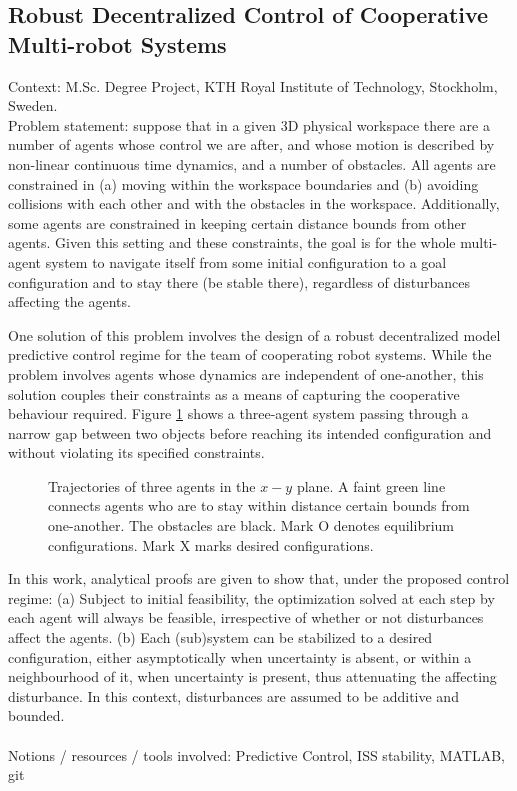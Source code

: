 \subsection{Robust Decentralized Control of Cooperative Multi-robot Systems}

Context: M.Sc. Degree Project, KTH Royal Institute of Technology, Stockholm, Sweden.\\

Problem statement: suppose that in a given 3D physical workspace there are
a number of agents whose control we are after, and whose motion is described by
non-linear continuous time dynamics, and a number of obstacles. All agents are
constrained in (a) moving within the workspace boundaries and (b) avoiding
collisions with each other and with the obstacles in the workspace.
Additionally, some agents are constrained in keeping certain distance bounds
from other agents. Given this setting and these constraints, the goal is for the
whole multi-agent system to navigate itself from some initial configuration to
a goal configuration and to stay there (be stable there), regardless of
disturbances affecting the agents.

One solution of this problem involves the design of a robust decentralized model
predictive control regime for the team of cooperating robot systems. While the
problem involves agents whose dynamics are independent of one-another, this solution
couples their constraints as a means of capturing the cooperative behaviour required.
Figure \ref{fig:d_OFF_res_trajectory_3_2} shows a three-agent system passing
through a narrow gap between two objects before reaching its intended
configuration and without violating its specified constraints.

\begin{figure}[H]\centering
  \scalebox{0.8}{}
  \caption{Trajectories of three agents in the $x-y$ plane. A faint green line
    connects agents who are to stay within distance certain bounds from
    one-another. The obstacles are black. Mark O denotes equilibrium
    configurations. Mark X marks desired configurations.}
  \label{fig:d_OFF_res_trajectory_3_2}
\end{figure}

In this work, analytical proofs are given to show that, under the proposed
control regime: (a) Subject to initial feasibility, the optimization solved at
each step by each agent will always be feasible, irrespective of whether or not
disturbances affect the agents. (b) Each (sub)system can be stabilized to a
desired configuration, either asymptotically when uncertainty is absent,
or within a neighbourhood of it, when uncertainty is present, thus attenuating
the affecting disturbance. In this context, disturbances are assumed to be
additive and bounded.\\\\
Notions / resources / tools involved: Predictive Control, ISS stability, MATLAB, git
